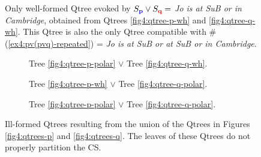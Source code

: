 \begin{figure}[H]\setlength{\fboxsep}{2pt}
	\centering
	\caption[]{Only well-formed Qtree evoked by $S\protect_{\textbf{\textcolor{blue}{p}}} \vee S\protect_{\textbf{\textcolor{red}{q}}} =$ \textit{Jo is at SuB or in Cambridge}, obtained from Qtrees \ref{fig4:qtree-p-wh} and \ref{fig4:qtree-q-wh}. This Qtree is also the only Qtree compatible with \#(\ref{ex4:pv(pvq)-repeated}) = \textit{Jo is at SuB or at SuB or in Cambridge}.}\label{fig4:qtree-pvq}
\end{figure}

\begin{figure}[H]\setlength{\fboxsep}{2pt}
	\centering
	\begin{subfigure}[b]{.3\linewidth}
		\centering
		\caption[]{Tree \ref{fig4:qtree-p-polar} $\vee$ Tree \ref{fig4:qtree-q-wh}.}
	\end{subfigure}\hfill
	\begin{subfigure}[b]{.3\linewidth}
		\centering
		\caption[]{Tree \ref{fig4:qtree-p-wh} $\vee$ Tree \ref{fig4:qtree-q-polar}.}
	\end{subfigure}\hfill
	\begin{subfigure}[b]{.3\linewidth}
		\centering
		\caption[]{Tree \ref{fig4:qtree-p-polar} $\vee$ Tree \ref{fig4:qtree-q-polar}.}
	\end{subfigure}
	\caption[]{Ill-formed Qtrees resulting from the union of the Qtrees in Figures \ref{fig4:qtrees-p} and \ref{fig4:qtrees-q}. The leaves of these Qtrees do not properly partition the CS.}
	\label{fig4:qtree-pvq-ill-formed}
\end{figure}


